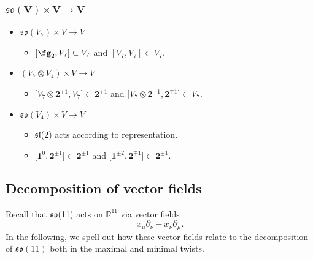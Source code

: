 \documentclass[pdftex]{sigma}
\numberwithin{equation}{section}
\theoremstyle{definition}
\def\R{\mathbb{R}}
\def\lie#1{\ensuremath{\mathfrak{#1}}}
\def\so{\lie{so}}
\begin{document}
\subsubsection[so(V) times V longrightarrow V]{$\boldsymbol{\lie{so}(V) \times V \longrightarrow V}$}
\begin{itemize}\itemsep=0pt
 \item[]\underline{$\lie{so}(V_7) \times V \longrightarrow V$}
 \begin{itemize}\itemsep=0pt
 \item[--] $[\fg_2, V_7] \subset V_7$ and $[V_7 , V_7] \subset V_7$.
 \end{itemize}
 \item[]\underline{$(V_7 \otimes V_4) \times V \longrightarrow V$}
 \begin{itemize}\itemsep=0pt
\item[--] $\big[V_7 \otimes \textbf{2}^{\pm 1} , V_7\big] \subset \textbf{2}^{\pm 1}$ and $\big[V_7 \otimes \textbf{2}^{\pm 1} , \textbf{2}^{\mp 1}\big] \subset V_7$.
 \end{itemize}
 \item[]\underline{$\lie{so}(V_4) \times V \longrightarrow V$}
\begin{itemize}\itemsep=0pt
\item[--] \lie{sl}(2) acts according to representation.
\item[--] $\big[\textbf{1}^0 , \textbf{2}^{\pm 1}\big] \subset \textbf{2}^{\pm 1}$ and $\big[\textbf{1}^{\pm 2} , \textbf{2}^{\mp 1}\big] \subset \textbf{2}^{\pm 1}$.
 \end{itemize}
\end{itemize}

\subsection{Decomposition of vector fields}
Recall that \lie{so}(11) acts on $\R^{11}$ via vector fields
\begin{equation}\label{eq: so-action}
 x_\mu \partial_\nu - x_\nu \partial_\mu .
\end{equation}
In the following, we spell out how these vector fields relate to the decomposition of $\so(11)$ both in the maximal and minimal twists.
\end{document}
